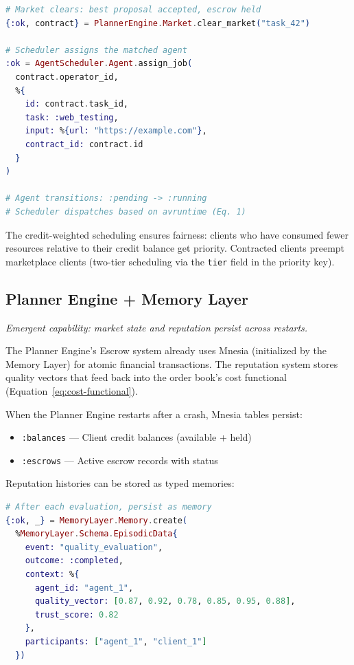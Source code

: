 \documentclass[12pt,a4paper]{article}
\theoremstyle{definition}
\begin{document}
\begin{lstlisting}[language=elixir, caption={Market clearing dispatches to scheduler}]
# Market clears: best proposal accepted, escrow held
{:ok, contract} = PlannerEngine.Market.clear_market("task_42")

# Scheduler assigns the matched agent
:ok = AgentScheduler.Agent.assign_job(
  contract.operator_id,
  %{
    id: contract.task_id,
    task: :web_testing,
    input: %{url: "https://example.com"},
    contract_id: contract.id
  }
)

# Agent transitions: :pending -> :running
# Scheduler dispatches based on avruntime (Eq. 1)
\end{lstlisting}

The credit-weighted scheduling ensures fairness: clients who have consumed
fewer resources relative to their credit balance get priority.
Contracted clients preempt marketplace clients (two-tier scheduling via
the \texttt{tier} field in the priority key).

\subsection{Planner Engine + Memory Layer}\label{subsec:planner-memory}

\emph{Emergent capability: market state and reputation persist across restarts.}

The Planner Engine's Escrow system already uses Mnesia (initialized by the
Memory Layer) for atomic financial transactions. The reputation system
stores quality vectors that feed back into the order book's cost functional
(Equation~\ref{eq:cost-functional}).

When the Planner Engine restarts after a crash, Mnesia tables persist:
\begin{itemize}
  \item \texttt{:balances} --- Client credit balances (available + held)
  \item \texttt{:escrows} --- Active escrow records with status
\end{itemize}

Reputation histories can be stored as typed memories:

\begin{lstlisting}[language=elixir, caption={Reputation stored as typed memory}]
# After each evaluation, persist as memory
{:ok, _} = MemoryLayer.Memory.create(
  %MemoryLayer.Schema.EpisodicData{
    event: "quality_evaluation",
    outcome: :completed,
    context: %{
      agent_id: "agent_1",
      quality_vector: [0.87, 0.92, 0.78, 0.85, 0.95, 0.88],
      trust_score: 0.82
    },
    participants: ["agent_1", "client_1"]
  })
\end{lstlisting}
\end{document}
